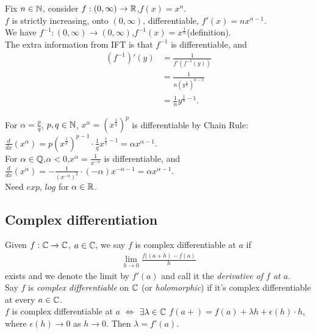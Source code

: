 \documentclass[a4paper]{article}
\begin{document}
\begin{eg}
Fix $n\in \mathbb{N}$, consider $f:\left(0,\infty\right)\to\mathbb{R}$,$f\left(x\right)=x^n$.\\
$f$ is strictly increasing, onto $\left(0,\infty\right)$, differentiable, $f'\left(x\right)=nx^{n-1}$.\\
We have $f^{-1}:\left(0,\infty\right)\to\left(0,\infty\right)$,$f^{-1}\left(x\right)=x^{\frac{1}{n}}$(definition).\\
The extra information from IFT is that $f^{-1}$ is differentiable, and
\begin{equation*}
\begin{aligned}
\left(f^{-1}\right)'\left(y\right)&=\frac{1}{f'\left(f^{-1}\left(y\right)\right)}\\
&=\frac{1}{n\left(y^{\frac{1}{n}}\right)^{n-1}}\\
&=\frac{1}{n} y^{\frac{1}{n}-1}.
\end{aligned}
\end{equation*}
\end{eg}
For $\alpha=\frac{p}{q}$, $p,q\in\mathbb{N}$, $x^\alpha = \left(x^{\frac{1}{q}}\right)^p$ is differentiable by Chain Rule:\\
$\frac{d}{dx}\left(x^\alpha\right)=p\left(x^\frac{1}{q}\right)^{p-1}\cdot\frac{1}{q}x^{\frac{1}{q}-1}=\alpha x^{\alpha-1}$.\\
For $\alpha\in\mathbb{Q}$,$\alpha<0$,$x^\alpha = \frac{1}{x^{-\alpha}}$ is differentiable, and\\
$\frac{d}{dx}\left(x^\alpha\right)=-\frac{1}{\left(x^{-\alpha}\right)^2}\cdot\left(-\alpha\right)x^{-\alpha-1}=\alpha x^{\alpha-1}$.\\
Need $exp$, $log$ for $\alpha \in \mathbb{R}$.\\

\subsection{Complex differentiation}
Given $f:\mathbb{C}\to\mathbb{C}$, $a\in\mathbb{C}$, we say $f$ is complex differentiable at $a$ if 
\begin{equation*}
\begin{aligned}
\lim_{h\to 0} \frac{f(\left(a+h\right)-f\left(a\right)}{h}
\end{aligned}
\end{equation*}
exists and we denote the limit by $f'\left(a\right)$ and call it the \emph{derivative of $f$ at $a$}.\\
Say $f$ is \emph{complex differentiable} on $\mathbb{C}$ (or \emph{holomorphic}) if it's complex differentiable at every $a\in\mathbb{C}$.\\
$f$ is complex differentiable at $a$ $\iff$ $\exists \lambda\in\mathbb{C}$ $f\left(a+\right)=f\left(a\right)+\lambda h+\epsilon\left(h\right)\cdot h$, where $\epsilon\left(h\right)\to 0$ as $h\to 0$. Then $\lambda = f'\left(a\right)$.\\
\end{document}
